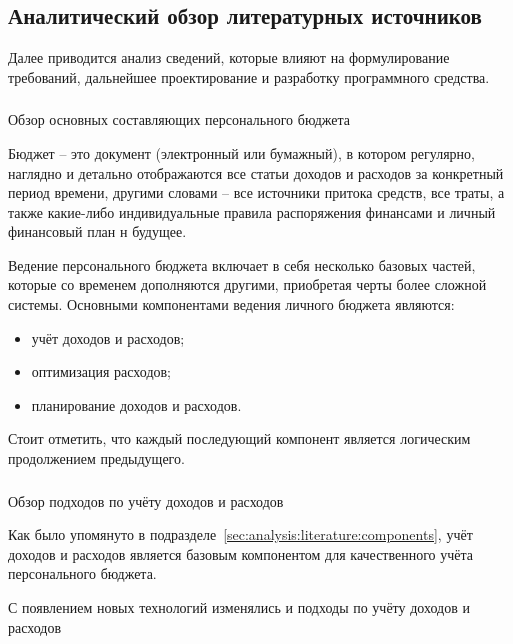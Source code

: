 \subsection{Аналитический обзор литературных источников}
\label{sec:analysis:literature}

Далее приводится анализ сведений, которые влияют на формулирование требований, дальнейшее проектирование и разработку программного средства.

\subsubsection{} Обзор основных составляющих персонального бюджета
\label{sec:analysis:literature:components}

Бюджет – это документ (электронный или бумажный), в котором регулярно, наглядно и детально отображаются все статьи доходов и расходов за конкретный период времени, другими словами -- все источники притока средств, все траты, а также какие-либо индивидуальные правила распоряжения финансами и личный финансовый план н будущее.~\cite{budget_blog} 

Ведение персонального бюджета включает в себя несколько базовых частей, которые со временем дополняются другими, приобретая черты более сложной системы. 
Основными компонентами ведения личного бюджета являются: 
\begin{itemize}
    \item учёт доходов и расходов;
    \item оптимизация расходов;
    \item планирование доходов и расходов.
\end{itemize}
Стоит отметить, что каждый последующий компонент является логическим продолжением предыдущего.



\subsubsection{} Обзор подходов по учёту доходов и расходов
\label{sec:analysis:literature:tracking}

Как было упомянуто в подразделе~\ref{sec:analysis:literature:components}, учёт доходов и расходов является базовым компонентом для качественного учёта персонального бюджета. 

С появлением новых технологий изменялись и подходы по учёту доходов и расходов 



